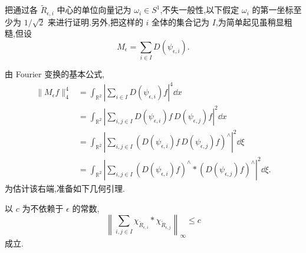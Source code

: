 把通过各 $\tilde{R}_{\epsilon,i}$ 中心的单位向量记为 $\omega_{i} \in S^{1}$,不失一般性,以下假定 $\omega_{i}$ 的第一坐标至少为 $1/\sqrt{2}$ 来进行证明.另外,把这样的 $i$ 全体的集合记为 $I$,为简单起见虽稍显粗糙,但设
\[
M_{\epsilon} = \sum_{i \in I}D(\psi_{\epsilon,i}).
\]

由 Fourier 变换的基本公式,
\begin{equation}\tag{4.9.4}
\begin{aligned}
\|M_{\epsilon}f\|_{4}^{4} & = \int_{\mathbb{R}^{2}}\left|\sum_{i \in I}D(\psi_{\epsilon,i})f\right|^{4}\dd x \\
& = \int_{\mathbb{R}^{2}}\left|\sum_{i,j \in I}D(\psi_{\epsilon,i})f\,D(\psi_{\epsilon,j})f\right|^{2}\dd x \\
& = \int_{\mathbb{R}^{2}}\left|\sum_{i,j \in I}\left(D(\psi_{\epsilon,i})f\,D(\psi_{\epsilon,j})f\right)^{\wedge}\right|^{2}\dd\xi \\
& = \int_{\mathbb{R}^{2}}\left|\sum_{i,j \in I}\left(D(\psi_{\epsilon,i})f\right)^{\wedge}*\left(D(\psi_{\epsilon,j})f\right)^{\wedge}\right|^{2}\dd\xi.
\end{aligned}
\label{eq:4.9.4}\end{equation}
为估计该右端,准备如下几何引理.

\begin{lemma}\label{lem:4.9.2}
以 $c$ 为不依赖于 $\epsilon$ 的常数,
\[
\left\|\sum_{i,j \in I}\chi_{\tilde{R}_{\epsilon,i}} * \chi_{\tilde{R}_{\epsilon,j}}\right\|_{\infty} \leq c
\]
成立.
\end{lemma}

